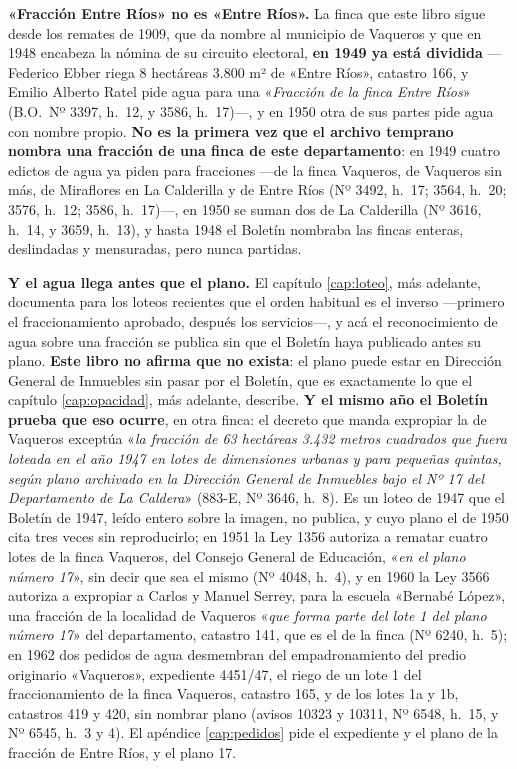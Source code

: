 \begin{cautela}
\textbf{«Fracción Entre Ríos» no es «Entre Ríos».} La finca que este libro sigue desde los
remates de 1909, que da nombre al municipio de Vaqueros y que en 1948 encabeza la nómina de su
circuito electoral, \textbf{en 1949 ya está dividida} ---Federico Ebber riega 8 hectáreas 3.800 m²
de «Entre Ríos», catastro 166, y Emilio Alberto Ratel pide agua para una «\textit{Fracción de la finca
Entre Ríos}» (B.O.\ Nº 3397, h.\ 12, y 3586, h.\ 17)---, y en 1950 otra de sus partes pide agua con
nombre propio. \textbf{No es la primera vez que el archivo temprano nombra una fracción de una finca
de este departamento}: en 1949 cuatro edictos de agua ya piden para fracciones ---de la finca
Vaqueros, de Vaqueros sin más, de Miraflores en La Calderilla y de Entre Ríos (Nº 3492, h.\ 17; 3564,
h.\ 20; 3576, h.\ 12; 3586, h.\ 17)---, en 1950 se suman dos de La Calderilla (Nº 3616, h.\ 14, y
3659, h.\ 13), y hasta 1948 el Boletín nombraba las fincas enteras, deslindadas y mensuradas, pero
nunca partidas.

\textbf{Y el agua llega antes que el plano.} El capítulo \ref{cap:loteo}, más adelante, documenta para los
loteos recientes que el orden habitual es el inverso ---primero el fraccionamiento aprobado,
después los servicios---, y acá el reconocimiento de agua sobre una fracción se publica sin
que el Boletín haya publicado antes su plano. \textbf{Este libro no afirma que no exista}: el
plano puede estar en Dirección General de Inmuebles sin pasar por el Boletín, que es
exactamente lo que el capítulo \ref{cap:opacidad}, más adelante, describe. \textbf{Y el mismo año el
Boletín prueba que eso ocurre}, en otra finca: el decreto que manda expropiar la de Vaqueros
exceptúa «\textit{la fracción de 63 hectáreas 3.432 metros cuadrados que fuera loteada en el año 1947
en lotes de dimensiones urbanas y para pequeñas quintas, según plano archivado en la Dirección
General de Inmuebles bajo el Nº 17 del Departamento de La Caldera}» (883-E, Nº 3646, h.\ 8). Es un
loteo de 1947 que el Boletín de 1947, leído entero sobre la imagen, no publica, y cuyo plano el de
1950 cita tres veces sin reproducirlo; en 1951 la Ley 1356 autoriza a rematar cuatro lotes de la finca Vaqueros, del Consejo General de Educación, «\textit{en el plano número 17}», sin decir que sea el mismo (Nº 4048, h.\ 4), y en 1960 la Ley 3566 autoriza a expropiar a Carlos y Manuel Serrey, para la escuela «Bernabé López», una fracción de la localidad de Vaqueros «\textit{que forma parte del lote 1 del plano número 17}» del departamento, catastro 141, que es el de la finca (Nº 6240, h.\ 5); en 1962 dos pedidos de agua desmembran del empadronamiento del predio originario «Vaqueros», expediente 4451/47, el riego de un lote 1 del fraccionamiento de la finca Vaqueros, catastro 165, y de los lotes 1a y 1b, catastros 419 y 420, sin nombrar plano (avisos 10323 y 10311, Nº 6548, h.\ 15, y Nº 6545, h.\ 3 y 4). El apéndice \ref{cap:pedidos} pide el expediente y el plano
de la fracción de Entre Ríos, y el plano 17.
\end{cautela}

